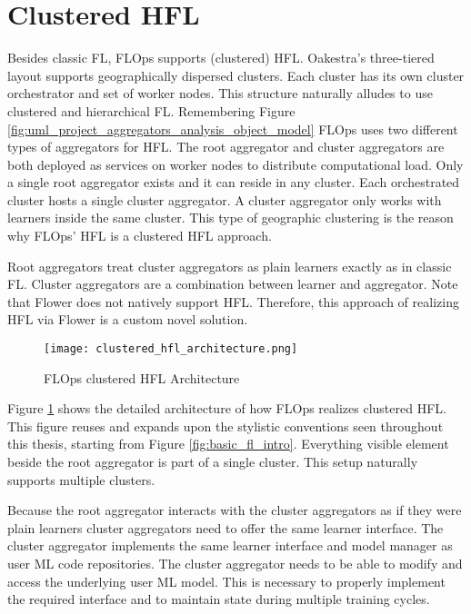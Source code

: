 \section{Clustered HFL}

Besides classic FL, FLOps supports (clustered) HFL.
Oakestra's three-tiered layout supports geographically dispersed clusters.
Each cluster has its own cluster orchestrator and set of worker nodes.
This structure naturally alludes to use clustered and hierarchical FL.
Remembering Figure \ref{fig:uml_project_aggregators_analysis_object_model} FLOps uses two different types of aggregators for HFL.
The root aggregator and cluster aggregators are both deployed as services on worker nodes to distribute computational load.
Only a single root aggregator exists and it can reside in any cluster.
Each orchestrated cluster hosts a single cluster aggregator.
A cluster aggregator only works with learners inside the same cluster.
This type of geographic clustering is the reason why FLOps' HFL is a clustered HFL approach.

Root aggregators treat cluster aggregators as plain learners exactly as in classic FL.
Cluster aggregators are a combination between learner and aggregator.
Note that Flower does not natively support HFL.
Therefore, this approach of realizing HFL via Flower is a custom novel solution.

\begin{figure}[p]
    \begin{adjustwidth}{-0.1\paperwidth}{-0.1\paperwidth}
        \centering
        \texttt{[image: clustered\_hfl\_architecture.png]}
        \caption{FLOps clustered HFL Architecture}
        \label{fig:flops_clustered_hfl_architecture}
    \end{adjustwidth}
\end{figure}

Figure \ref{fig:flops_clustered_hfl_architecture} shows the detailed architecture of how FLOps realizes clustered HFL.
This figure reuses and expands upon the stylistic conventions seen throughout this thesis, starting from Figure \ref{fig:basic_fl_intro}.
Everything visible element beside the root aggregator is part of a single cluster.
This setup naturally supports multiple clusters.

Because the root aggregator interacts with the cluster aggregators as if they were plain learners cluster aggregators need to offer the same learner interface.
The cluster aggregator implements the same learner interface and model manager as user ML code repositories.
The cluster aggregator needs to be able to modify and access the underlying user ML model.
This is necessary to properly implement the required interface and to maintain state during multiple training cycles.

